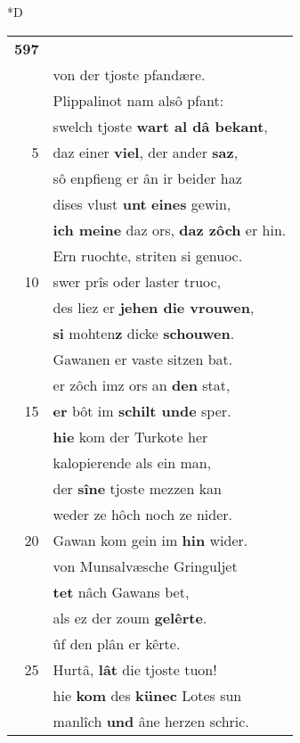 \documentclass[8pt,a4paper,notitlepage]{article}
\begin{document}
\begin{table}[ht]
\begin{minipage}[t]{0.5\linewidth}
\small
\begin{center}*D
\end{center}
\begin{tabular}{rl}
\textbf{597} & \textit{\begin{large}G\end{large}}awan vriesch diu mære\\ 
 & von der tjoste pfandære.\\ 
 & Plippalinot nam alsô pfant:\\ 
 & swelch tjoste \textbf{wart al dâ bekant},\\ 
5 & daz einer \textbf{viel}, der ander \textbf{saz},\\ 
 & sô enpfieng er ân ir beider haz\\ 
 & dises vlust \textbf{unt} \textbf{eines} gewin,\\ 
 & \textbf{ich meine} daz ors, \textbf{daz zôch} er hin.\\ 
 & Ern ruochte, striten si genuoc.\\ 
10 & swer prîs oder laster truoc,\\ 
 & des liez er \textbf{jehen die vrouwen},\\ 
 & \textbf{si} mohten\textbf{z} dicke \textbf{schouwen}.\\ 
 & Gawanen er vaste sitzen bat.\\ 
 & er zôch imz ors an \textbf{den} stat,\\ 
15 & \textbf{er} bôt im \textbf{schilt unde} sper.\\ 
 & \textbf{hie} kom der Turkote her\\ 
 & kalopierende als ein man,\\ 
 & der \textbf{sîne} tjoste mezzen kan\\ 
 & weder ze hôch noch ze nider.\\ 
20 & Gawan kom gein im \textbf{hin} wider.\\ 
 & von Munsalvæsche Gringuljet\\ 
 & \textbf{tet} nâch Gawans bet,\\ 
 & als ez der zoum \textbf{gelêrte}.\\ 
 & ûf den plân er kêrte.\\ 
25 & Hurtâ, \textbf{lât} die tjoste tuon!\\ 
 & hie \textbf{kom} des \textbf{künec} Lotes sun\\ 
 & manlîch \textbf{und} âne herzen schric.\\ 

\end{tabular}
\end{minipage}
\end{table}
\end{document}
